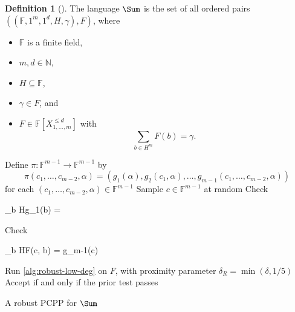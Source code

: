 \documentclass[english,12pt]{reedthesis}
\theoremstyle{plain}
\theoremstyle{definition}
\newtheorem{defn}[defn]{Definition}
\theoremstyle{remark}
\begin{document}
\begin{defn}[{\cite[Def.\ 4.1]{GOS25}}]\label{def:sum-lang}
  The language $\Sum$ is the set of all ordered pairs
  $((\mathbb{F}, 1^{m}, 1^{d}, H, \gamma), F)$, where
  \begin{itemize}
    \item $\mathbb{F}$ is a finite field,
    \item $m, d \in \mathbb{N}$,
    \item $H \subseteq \mathbb{F}$,
    \item $\gamma \in F$, and
    \item $F \in \mathbb{F}[X_{1, \ldots, m}^{\le d}]$ with
          \[
            \sum_{b \in H^{m}}F(b) = \gamma.
          \]
  \end{itemize}
\end{defn}

\begin{algorithm}[htbp]
  Define $\pi: \mathbb{F}^{m-1} \rightarrow \mathbb{F}^{m-1}$ by
  \[
    \pi(c_{1}, \ldots, c_{m-2}, \alpha) = (g_{1}(\alpha), g_{2}(c_{1}, \alpha), \ldots, g_{m-1}(c_{1}, \ldots, c_{m-2}, \alpha))
  \]
  for each $(c_{1}, \ldots, c_{m-2}, \alpha) \in \mathbb{F}^{m-1}$\;
  \KwRet{$\pi$}\;
  Sample $c \in \mathbb{F}^{m-1}$ at random\;
  Check
  \begin{algomathdisplay}
    \sum_{b \in H}g_{1}(b) = \gamma
  \end{algomathdisplay}
  Check
  \begin{algomathdisplay}
    \sum_{b \in H}F(c, b) = g_{m-1}(c)
  \end{algomathdisplay}
  Run \cref{alg:robust-low-deg} on $F$, with proximity parameter
  $\delta_{R} = \min(\delta, 1/5)$\;
  Accept if and only if the prior test passes\;
  \caption{A robust PCPP for $\Sum$~\cite[Construction 4.3]{GOS25}}\label{alg:sum-pcpp}
\end{algorithm}
\end{document}

